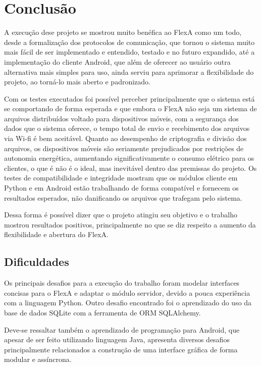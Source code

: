 
\chapter{Conclusão}
\label{cap5}

    A execução dese projeto se mostrou muito benéfica ao FlexA como um todo, desde a formalização dos protocolos de comunicação, que tornou o sistema muito mais fácil de ser implementado e entendido, testado e no futuro expandido, até a implementação do cliente Android, que além de oferecer ao usuário outra alternativa mais simples para uso, ainda serviu para aprimorar a flexibilidade do projeto, ao torná-lo mais aberto e padronizado.
    
    Com os testes executados foi possível perceber principalmente que o sistema está se comportando de forma esperada e que embora o FlexA não seja um sistema de arquivos distribuídos voltado para dispositivos móveis, com a segurança dos dados que o sistema oferece, o tempo total de envio e recebimento dos arquivos via Wi-fi é bem aceitável. Quanto ao desempenho de criptografia e divisão dos arquivos, os dispositivos móveis são seriamente prejudicados por restrições de autonomia energética, aumentando significativamente o consumo elétrico para os clientes, o que é não é o ideal, mas inevitável dentro das premissas do projeto. Os testes de compatibilidade e integridade mostram que os módulos cliente em Python e em Android estão trabalhando de forma compatível e fornecem os resultados esperados, não danificando os arquivos que trafegam pelo sistema.
    
    Dessa forma é possível dizer que o projeto atingiu seu objetivo e o trabalho mostrou resultados positivos, principalmente no que se diz respeito a aumento da flexibilidade e abertura do FlexA.
    
    
    \section{Dificuldades}
    
    Os principais desafios para a execução do trabalho foram modelar interfaces concisas para o FlexA e adaptar o módulo servidor, devido a pouca experiência com a linguagem Python. Outro desafio encontrado foi  o aprendizado do uso da base de dados SQLite com a ferramenta de ORM SQLAlchemy.
    
    Deve-se ressaltar também o aprendizado de programação para Android, que apesar de ser feito utilizando linguagem Java, apresenta diversos desafios principalmente relacionados a construção de uma interface gráfica de forma modular e assíncrona.
    
